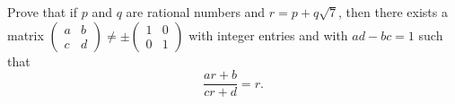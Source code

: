 Prove that if \(p\) and \(q\) are rational numbers and \(r = p + q\sqrt{7}\), then there exists a matrix \(\begin{pmatrix} a & b \\ c & d \end{pmatrix} \ne \pm \begin{pmatrix} 1 & 0 \\ 0 & 1 \end{pmatrix}\) with integer entries and with \(ad - bc = 1\) such that
\[ \frac{ar + b}{cr + d} = r.  \]
